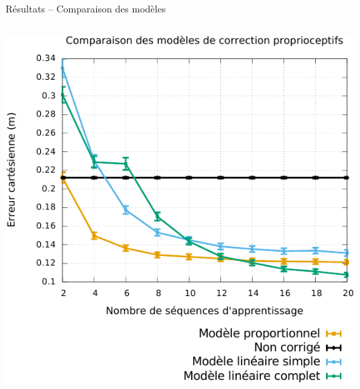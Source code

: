 \begin{frame}{Résultats -- Comparaison des modèles}
\begin{columns}
\begin{column}{0.5\linewidth}
            \includegraphics[type=pdf,ext=.pdf,read=.pdf,width=1.0\linewidth]{../plot/OdometryCMAES/convergenceReads}
        \end{column}
    \end{columns}
\end{frame}

